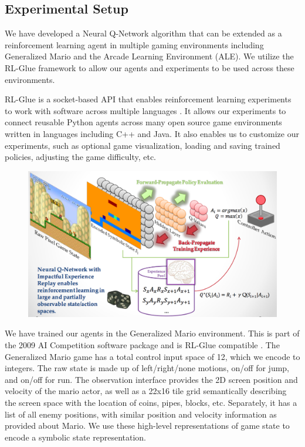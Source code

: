 \documentclass{article}
\begin{document}
\subsection{Experimental Setup}

We have developed a Neural Q-Network algorithm that can be extended as a reinforcement learning agent in multiple gaming environments including Generalized Mario and the Arcade Learning Environment (ALE). We utilize the RL-Glue framework to allow our agents and experiments to be used across these environments.

RL-Glue is a socket-based API that enables reinforcement learning experiments to work with software across multiple languages \cite{Tanner09}. It allows our experiments to connect reusable Python agents across many open source game environments written in languages including C++ and Java. It also enables us to customize our experiments, such as optional game visualization, loading and saving trained policies, adjusting the game difficulty, etc.

 \begin{figure}
 \begin{center}
\includegraphics[scale=0.19]{main_figure.png}
\end{center}
\end{figure}

We have trained our agents in the Generalized Mario environment. This is part of the 2009 AI Competition software package and is RL-Glue compatible \cite{Togelius10}. The Generalized Mario game has a total control input space of 12, which we encode to integers. The raw state is made up of left/right/none motions, on/off for jump, and on/off for run. The observation interface provides the 2D screen position and velocity of the mario actor, as well as a 22x16 tile grid semantically describing the screen space with the location of coins, pipes, blocks, etc. Separately, it has a list of all enemy positions, with similar position and velocity information as provided about Mario. We use these high-level representations of game state to encode a symbolic state representation.
\end{document}
